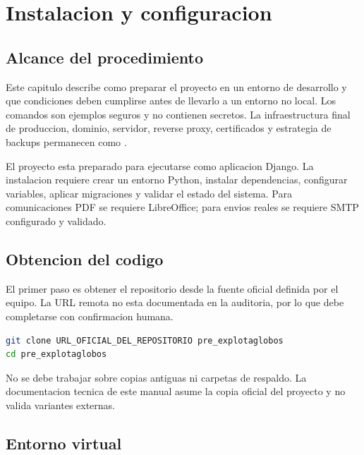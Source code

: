 \chapter{Instalacion y configuracion}
\label{chap:instalacion-configuracion}

\section{Alcance del procedimiento}
\label{sec:instalacion-alcance}

Este capitulo describe como preparar el proyecto en un entorno de desarrollo y que condiciones deben cumplirse antes de llevarlo a un entorno no local. Los comandos son ejemplos seguros y no contienen secretos. La infraestructura final de produccion, dominio, servidor, reverse proxy, certificados y estrategia de backups permanecen como \MarcadorProduccionPendiente.

El proyecto esta preparado para ejecutarse como aplicacion Django. La instalacion requiere crear un entorno Python, instalar dependencias, configurar variables, aplicar migraciones y validar el estado del sistema. Para comunicaciones PDF se requiere LibreOffice; para envios reales se requiere SMTP configurado y validado.

\section{Obtencion del codigo}
\label{sec:instalacion-clonacion}

El primer paso es obtener el repositorio desde la fuente oficial definida por el equipo. La URL remota no esta documentada en la auditoria, por lo que debe completarse con confirmacion humana.

\begin{lstlisting}[language=bash,caption={Clonacion con URL pendiente de confirmacion},label={lst:instalacion-clonar}]
git clone URL_OFICIAL_DEL_REPOSITORIO pre_explotaglobos
cd pre_explotaglobos
\end{lstlisting}

\begin{advertencia}
No se debe trabajar sobre copias antiguas ni carpetas de respaldo. La documentacion tecnica de este manual asume la copia oficial del proyecto y no valida variantes externas.
\end{advertencia}

\section{Entorno virtual}
\label{sec:instalacion-venv}

